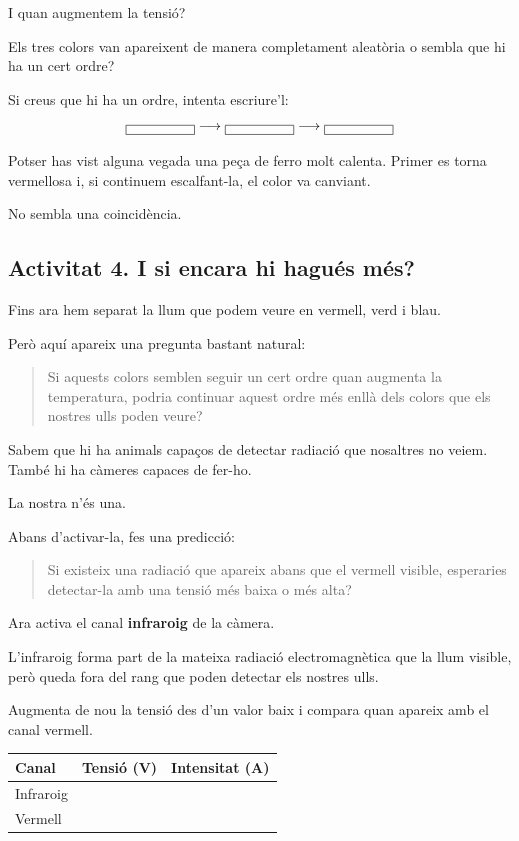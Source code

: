 I quan augmentem la tensió?

Els tres colors van apareixent de manera completament aleatòria o sembla que hi ha un cert ordre?

Si creus que hi ha un ordre, intenta escriure'l:
\[
\boxed{\hspace{1.5cm}}
\longrightarrow
\boxed{\hspace{1.5cm}}
\longrightarrow
\boxed{\hspace{1.5cm}}
\]

Potser has vist alguna vegada una peça de ferro molt calenta. Primer es torna vermellosa i, si continuem escalfant-la, el color va canviant.

No sembla una coincidència.

\subsection{Activitat 4. I si encara hi hagués més?}

Fins ara hem separat la llum que podem veure en vermell, verd i blau.

Però aquí apareix una pregunta bastant natural:
\begin{quote}
Si aquests colors semblen seguir un cert ordre quan augmenta la temperatura, podria continuar aquest ordre més enllà dels colors que els nostres ulls poden veure?
\end{quote}

Sabem que hi ha animals capaços de detectar radiació que nosaltres no veiem. També hi ha càmeres capaces de fer-ho.

La nostra n'és una.

Abans d'activar-la, fes una predicció:
\begin{quote}
Si existeix una radiació que apareix abans que el vermell visible, esperaries detectar-la amb una tensió més baixa o més alta?
\end{quote}

Ara activa el canal \textbf{infraroig} de la càmera.

L'infraroig forma part de la mateixa radiació electromagnètica que la llum visible, però queda fora del rang que poden detectar els nostres ulls.

Augmenta de nou la tensió des d'un valor baix i compara quan apareix amb el canal vermell.
\begin{center}
\renewcommand{\arraystretch}{1.6}
\begin{tabularx}{\linewidth}{|X|
                                >{\centering\arraybackslash}X|
                                >{\centering\arraybackslash}X|}
\hline
\textbf{Canal} &
\textbf{Tensió (V)} &
\textbf{Intensitat (A)} \\
\hline
Infraroig & & \\ \hline
Vermell   & & \\ \hline
\end{tabularx}
\end{center}

